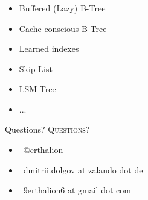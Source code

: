\documentclass[usenames,dvipsnames, 18pt, compress, aspectratio=169]{beamer}
\def\twitter{{\FA \faTwitter}}
\def\email{{\FA \faEnvelope}}
\begin{document}
\begin{frame}[fragile]{}
    \frametitle{}

    \begin{center}
        \begin{itemize}[label={\MVRightarrow}]
            \item <+-> Buffered (Lazy) B-Tree
            \item <+-> Cache conscious B-Tree
            \item <+-> Learned indexes
            \item <+-> Skip List
            \item <+-> LSM Tree
            \item <+-> ...
        \end{itemize}
    \end{center}
\end{frame}

\fontsize{18pt}{18}\selectfont
\begin{frame}
  \vspace*{2.5cm}
  \begin{minipage}[b][\paperheight]{\textwidth}
  \begin{center}

      \linespread{1.0}%
      \if@noSmallCapitals%
        Questions?
      \else%
        \scshape{\color{black} Questions?}%
      \fi%
      \vspace*{0.3em}

      \fontsize{13pt}{14}\selectfont
        \begin{itemize}[label={}]
            \item {\color{black} \twitter\ @erthalion}
            \item {\color{black} \email\ dmitrii.dolgov at zalando dot de}
            \item {\color{black} \email\ 9erthalion6 at gmail dot com}
        \end{itemize}
      \vspace*{2.5em}%

    \vfill
    \vspace*{2em}
  \end{center}
  \end{minipage}

\end{frame}
\end{document}
